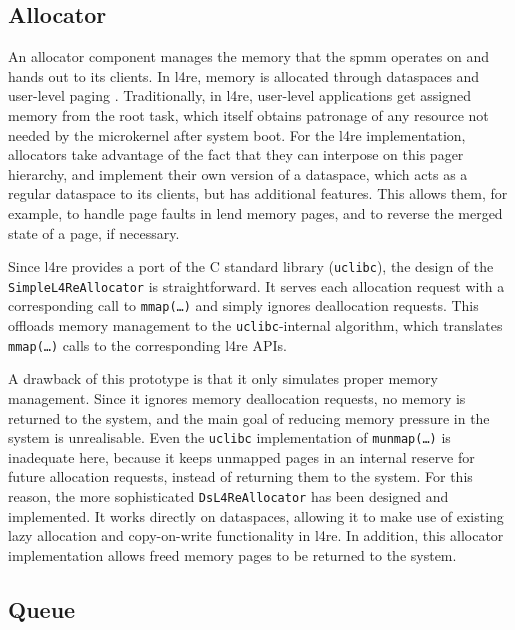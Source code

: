 \subsection*{Allocator}
\label{subsec:allocator}

An allocator component manages the memory that the \ac{spmm} operates on and hands out to its clients.
In \ac{l4re}, memory is allocated through dataspaces and user-level paging \cite{l4re-dataspace}.
Traditionally, in \ac{l4re}, user-level applications get assigned memory from the root task, which itself obtains patronage of any resource not needed by the microkernel after system boot.
For the \ac{l4re} implementation, allocators take advantage of the fact that they can interpose on this pager hierarchy, and implement their own version of a dataspace, which acts as a regular dataspace to its clients, but has additional features.
This allows them, for example, to handle page faults in lend memory pages, and to reverse the merged state of a page, if necessary.

Since \ac{l4re} provides a port of the C standard library (\texttt{uclibc}), the design of the \texttt{Simple\-L4Re\-Allocator} is straightforward.
It serves each allocation request with a corresponding call to \texttt{mmap(\ldots)} and simply ignores deallocation requests.
This offloads memory management to the \texttt{uclibc}-internal algorithm, which translates \texttt{mmap(\ldots)} calls to the corresponding \ac{l4re} APIs.

A drawback of this prototype is that it only simulates proper memory management.
Since it ignores memory deallocation requests, no memory is returned to the system, and the main goal of reducing memory pressure in the system is unrealisable.
Even the \texttt{uclibc} implementation of \texttt{munmap(\ldots)} is inadequate here, because it keeps unmapped pages in an internal reserve for future allocation requests, instead of returning them to the system.
For this reason, the more sophisticated \texttt{Ds\-L4Re\-Allocator} has been designed and implemented.
It works directly on dataspaces, allowing it to make use of existing lazy allocation and copy-on-write functionality in \ac{l4re}.
In addition, this allocator implementation allows freed memory pages to be returned to the system.

\subsection*{Queue}
\label{subsec:queue}

